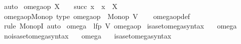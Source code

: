 \begin{isabellebody}
\ auto%
\endisatagproof
{\isafoldproof}%
%
\isadelimproof
%
\endisadelimproof
%
\isadelimdocument
%
\endisadelimdocument
%
\isatagdocument
%
\isamarkuptrue%
%
\endisatagdocument
{\isafolddocument}%
%
\isadelimdocument
%
\endisadelimdocument
{}\isamarkupfalse%
\ {\isachardoublequoteopen}omega{\isacharunderscore}{\kern0pt}op\ X\ {\isacharequal}{\kern0pt}\ {\isacharbraceleft}{\kern0pt}{\isacharbraceleft}{\kern0pt}{\isacharbraceright}{\kern0pt}{\isacharbraceright}{\kern0pt}\ {\isasymunion}\ {\isacharbraceleft}{\kern0pt}succ\ x\ {\isacharbar}{\kern0pt}\ x\ {\isasymin}\ X{\isacharbraceright}{\kern0pt}{\isachardoublequoteclose}\isanewline
\isanewline
{}\isamarkupfalse%
\ omega{\isacharunderscore}{\kern0pt}op{\isacharunderscore}{\kern0pt}Monop\ {\isacharbrackleft}{\kern0pt}type{\isacharbrackright}{\kern0pt}{\isacharcolon}{\kern0pt}\ {\isachardoublequoteopen}omega{\isacharunderscore}{\kern0pt}op\ {\isacharcolon}{\kern0pt}\ Monop\ V{\isachardoublequoteclose}\isanewline
%
\isadelimproof
\ \ %
\endisadelimproof
%
\isatagproof
{}\isamarkupfalse%
\ omega{\isacharunderscore}{\kern0pt}op{\isacharunderscore}{\kern0pt}def\ \isamarkupfalse%
\ {\isacharparenleft}{\kern0pt}rule\ MonopI{\isacharparenright}{\kern0pt}\ auto%
\endisatagproof
{\isafoldproof}%
%
\isadelimproof
\isanewline
%
\endisadelimproof
\isanewline
{}\isamarkupfalse%
\ {\isachardoublequoteopen}omega\ {\isasymequiv}\ lfp\ V\ omega{\isacharunderscore}{\kern0pt}op{\isachardoublequoteclose}\isanewline
\isanewline
{}\isamarkupfalse%
\ isa{\isacharunderscore}{\kern0pt}set{\isacharunderscore}{\kern0pt}omega{\isacharunderscore}{\kern0pt}syntax\ \ \isamarkupfalse%
\ omega\ {\isacharparenleft}{\kern0pt}{\isachardoublequoteopen}{\isasymomega}{\isachardoublequoteclose}{\isacharparenright}{\kern0pt}\ \isamarkupfalse%
\isanewline
{}\isamarkupfalse%
\ no{\isacharunderscore}{\kern0pt}isa{\isacharunderscore}{\kern0pt}set{\isacharunderscore}{\kern0pt}omega{\isacharunderscore}{\kern0pt}syntax\ \ \isamarkupfalse%
\ omega\ {\isacharparenleft}{\kern0pt}{\isachardoublequoteopen}{\isasymomega}{\isachardoublequoteclose}{\isacharparenright}{\kern0pt}\ \isamarkupfalse%
\isanewline
{}\isamarkupfalse%
\ isa{\isacharunderscore}{\kern0pt}set{\isacharunderscore}{\kern0pt}omega{\isacharunderscore}{\kern0pt}syntax\isanewline

\end{isabellebody}
